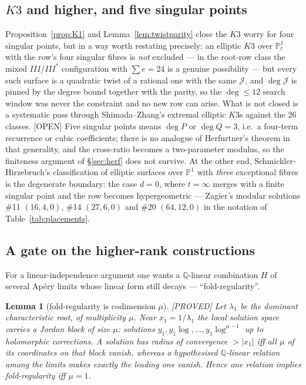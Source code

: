 \documentclass[11pt,reqno]{amsart}
\theoremstyle{plain}
\newtheorem{lemma}[theorem]{Lemma}
\theoremstyle{definition}
\theoremstyle{remark}
\theoremstyle{plain}
\newcommand{\Q}{\mathbb{Q}}
\newcommand{\PP}{\mathbb{P}}
\newcommand{\Proved}{\textup{\textsf{[PROVED]}}}
\newcommand{\Open}{\textup{\textsf{[OPEN]}}}
\begin{document}
\subsection*{$K3$ and higher, and five singular points}
Proposition~\ref{prop:K1} and Lemma~\ref{lem:twistparity} close the $K3$ worry
for four singular points, but in a way worth restating precisely: an elliptic
$K3$ over $\PP^1_t$ with the row's four singular fibres is \emph{not} excluded
--- in the root-row class the mixed $III/III^*$ configuration with $\sum e=24$ is
a genuine possibility --- but every such surface is a quadratic twist of a
rational one with the same $\mathcal J$, and $\deg\mathcal J$ is pinned by the
degree bound together with the parity, so the $\deg\le12$ search window was never
the constraint and no new row can arise. What is not closed is a systematic pass
through Shimada--Zhang's extremal elliptic $K3$s \cite{ShimadaZhang} against the
$26$ classes. \Open{} Five singular points means $\deg P$ or $\deg Q=3$, i.e.\ a
four-term recurrence or cubic coefficients; there is no analogue of Herfurtner's
theorem in that generality, and the cross-ratio becomes a two-parameter modulus,
so the finiteness argument of \S\ref{sec:herf} does not survive. At the other
end, Schmickler-Hirzebruch's classification of elliptic surfaces over $\PP^1$
with \emph{three} exceptional fibres \cite{SchmicklerHirzebruch} is the
degenerate boundary: the case $d=0$, where $t=\infty$ merges with a finite
singular point and the row becomes hypergeometric --- Zagier's modular solutions
\#11 $(16,4,0)$, \#14 $(27,6,0)$ and \#20 $(64,12,0)$ in the notation of
Table~\ref{tab:placements}.

\subsection*{A gate on the higher-rank constructions}
For a linear-independence argument one wants a $\Q$-linear combination $H$ of
several Ap\'ery limits whose linear form still decays --- ``fold-regularity''.

\begin{lemma}[fold-regularity is codimension $\mu$]\label{lem:foldreg}
\Proved{} Let $\lambda_1$ be the dominant characteristic root, of multiplicity
$\mu$. Near $x_1=1/\lambda_1$ the local solution space carries a Jordan block of
size $\mu$: solutions $y_1,y_1\log,\dots,y_1\log^{\mu-1}$ up to holomorphic
corrections. A solution has radius of convergence $>|x_1|$ iff \emph{all $\mu$}
of its coordinates on that block vanish, whereas a hypothesised $\Q$-linear
relation among the limits makes exactly the \emph{leading} one vanish. Hence one
relation implies fold-regularity iff $\mu=1$.
\end{lemma}
\end{document}
